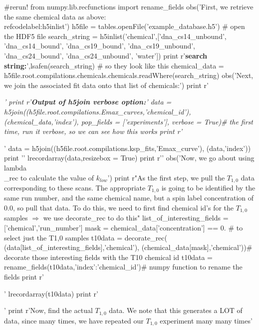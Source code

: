 \label{codelabel:h5label}
\begin{python}
#rerun!
from numpy.lib.recfunctions import rename_fields
obs('First, we retrieve the same chemical data as above:\\ref{codelabel:h5inlist}\n\n')
h5file = tables.openFile('example_database.h5') # open the HDF5 file
search_string = h5inlist('chemical',['dna_cs14_unbound',
    'dna_cs14_bound',
    'dna_cs19_bound',
    'dna_cs19_unbound',
    'dna_cs24_bound',
    'dna_cs24_unbound',
    'water'])
print r'\textbf{search string:}',lsafen(search_string) # so they look like this
chemical_data = h5file.root.compilations.chemicals.chemicals.readWhere(search_string)
obs('Next, we join the associated fit data onto that list of chemicals:\n\n')
print r'\begin{tiny}\begingroup \it'
print r'\textbf{Output of h5join verbose option:}'
data = h5join((h5file.root.compilations.Emax_curves,'chemical_id'),
    (chemical_data,'index'),
    pop_fields = ['experiments'],
    verbose = True)# the first time, run it verbose, so we can see how this works
print r'\endgroup\end{tiny}'
data = h5join((h5file.root.compilations.ksp_fits,'Emax_curve'),
    (data,'index'))
print '\n{}\n\n'
lrecordarray(data,resizebox = True)
print r'\label{codelabel:h5join_and_lambda_rec}'
obs('Now, we go about using lambda\\_rec to calculate the value of $k_{low}$')
print r"As the first step, we pull the $T_{1,0}$ data corresponding to these scans.  The appropriate $T_{1,0}$ is going to be identified by the same run number, and the same chemical name, but a spin label concentration of 0.0, so pull that data.  To do this, we need to first find chemical id's for the $T_{1,0}$ samples $\Rightarrow$ we use decorate\_rec to do this"
list_of_interesting_fields = ['chemical','run_number']
mask = chemical_data['concentration'] == 0. # to select just the T1,0 samples
t10data = decorate_rec( (data[list_of_interesting_fields],'chemical'),
    (chemical_data[mask],'chemical'))# decorate those interesting fields with the T10 chemical id
t10data = rename_fields(t10data,{'index':'chemical_id'})# numpy function to rename the fields
print r'\begin{tiny}'
lrecordarray(t10data)
print r'\end{tiny}'
print r'Now, find the actual $T_{1,0}$ data.  We note that this generates a LOT of data, since many times, we have repeated our $T_{1,0}$ experiment many many times'

\end{python}
